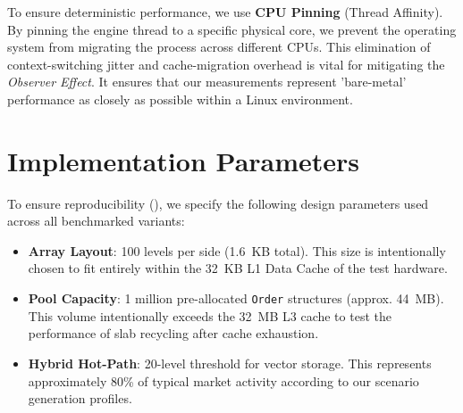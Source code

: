 To ensure deterministic performance, we use \textbf{CPU Pinning} (Thread 
Affinity). 
By pinning the engine thread to a specific physical core, we prevent the 
operating system from migrating the process across different CPUs. 
This elimination of context-switching jitter and cache-migration overhead is 
vital for mitigating the \textit{Observer Effect}. 
It ensures that our measurements represent 'bare-metal' performance as closely 
as possible within a Linux environment.

\section{Implementation Parameters}
\label{sec:implementation_parameters}
To ensure reproducibility (), we specify the following design 
parameters used across all benchmarked variants: 

\begin{itemize}
    \item \textbf{Array Layout}: 100 levels per side (1.6~KB total). This size is intentionally chosen to fit entirely within the 32~KB L1 Data Cache of the test hardware.
    \item \textbf{Pool Capacity}: 1 million pre-allocated \texttt{Order} structures (approx. 44~MB). This volume intentionally exceeds the 32~MB L3 cache to test the performance of slab recycling after cache exhaustion.
    \item \textbf{Hybrid Hot-Path}: 20-level threshold for vector storage. This represents approximately 80\% of typical market activity according to our scenario generation profiles.
\end{itemize}
